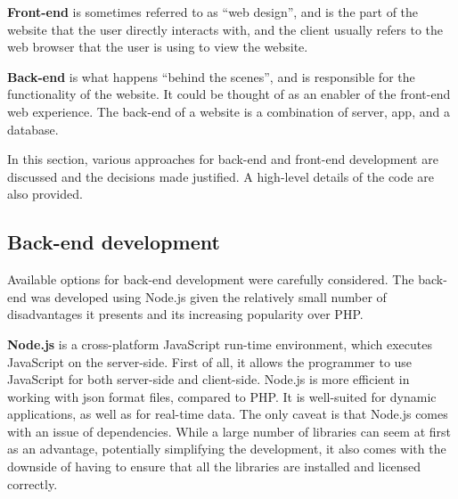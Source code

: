 \textbf{Front-end} is sometimes referred to as ``web design'', and is the part of the website that the user directly interacts with, and the client usually refers to the web browser that the user is using to view the website.

\textbf{Back-end} is what happens ``behind the scenes'', and is responsible for the functionality of the website. It could be thought of as an enabler of the front-end web experience. The back-end of a website is a combination of server, app, and a database.

In this section, various approaches for back-end and front-end development are discussed and the decisions made justified. A high-level details of the code are also provided.

\subsection{Back-end development}

Available options for back-end development were carefully considered. The back-end was developed using Node.js given the relatively small number of disadvantages it presents and its increasing popularity over PHP.



\textbf{Node.js} is a cross-platform JavaScript run-time environment, which executes JavaScript on the server-side. First of all, it allows the programmer to use JavaScript for both server-side and client-side. Node.js is more efficient in working with \gls{json} format files, compared to PHP. It is well-suited for dynamic applications, as well as for real-time data. The only caveat is that Node.js comes with an issue of dependencies. While a large number of libraries can seem at first as an advantage, potentially simplifying the development, it also comes with the downside of having to ensure that all the libraries are installed and licensed correctly.

